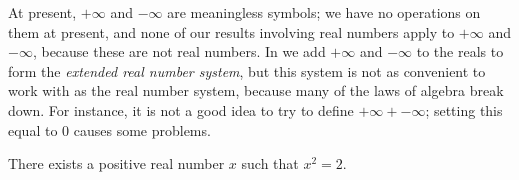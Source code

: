 \begin{rmk}\label{i:5.5.11}
  At present, \(+\infty\) and \(-\infty\) are meaningless symbols;
  we have no operations on them at present, and none of our results involving real numbers apply to \(+\infty\) and \(-\infty\), because these are not real numbers.
  In  we add \(+\infty\) and \(-\infty\) to the reals to form the \emph{extended real number system}, but this system is not as convenient to work with as the real number system, because many of the laws of algebra break down.
  For instance, it is not a good idea to try to define \(+\infty + -\infty\);
  setting this equal to \(0\) causes some problems.
\end{rmk}

\begin{prop}\label{i:5.5.12}
  There exists a positive real number \(x\) such that \(x^2 = 2\).
\end{prop}


